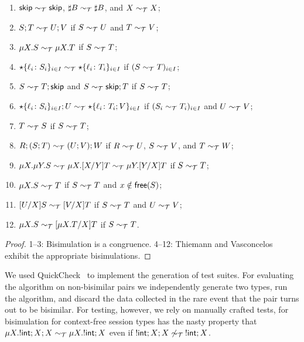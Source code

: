 \begin{theorem}
  \begin{enumerate}
  \item $\mathsf{skip} \sim_\mathcal T \mathsf{skip}$,  $\sharp B \sim_\mathcal T \sharp B$, and
    $X \sim_\mathcal T X$;
  \item $S;T \sim_\mathcal T U;V$ if $S \sim_\mathcal T U$ and $T \sim_\mathcal T V$; 
  \item $\mu X.S \sim_\mathcal T \mu X.T$ if $S \sim_\mathcal T T$; 
  \item $\star\{\ell_i\colon S_i\}_{i\in I}\sim_\mathcal T
    \star\{\ell_i\colon T_i\}_{i\in I}$ if $(S \sim_\mathcal T T)_{i\in
      I}$;
  \item $S\sim_\mathcal T T;\mathsf{skip}$ and $S\sim_\mathcal T \mathsf{skip};T$ if $S \sim_\mathcal T T$;
  \item $\star\{\ell_i\colon S_i\}_{i\in I};U\sim_\mathcal T
    \star\{\ell_i\colon T_i;V\}_{i\in I}$ if $(S_i \sim_\mathcal T T_i)_{i\in
      I}$ and $U \sim_\mathcal T V$;
  \item $T \sim_\mathcal T S$ if $S \sim_\mathcal T T$;
  \item $R;(S;T) \sim_\mathcal T (U;V);W$ if $R \sim_\mathcal T U$, $S \sim_\mathcal T V$, and $T\sim_\mathcal T W$;
  \item
    $\mu X.\mu Y.S \sim_\mathcal T \mu X.[{X}/{Y}]T \sim_\mathcal T \mu Y.[{Y}/{X}]T$ if $S \sim_\mathcal T T$;
  \item $\mu X.S \sim_\mathcal T T$ if $S \sim_\mathcal T T$ and $x\notin\mathsf{free}(S)$;
  \item $[{U}/{X}]S\sim_\mathcal T [{V}/{X}]T$  if $S \sim_\mathcal T T$ and $U \sim_\mathcal T V$; 
  \item $\mu X.S \sim_\mathcal T [{\mu X.T}/{X}]T$ if $S \sim_\mathcal T T$.
  \end{enumerate}
\end{theorem}
%
\begin{proof}
  1--3: Bisimulation is a congruence. 4--12: Thiemann and
  Vasconcelos~\cite{thiemann2016context} exhibit the appropriate
  bisimulations.
\end{proof}

We used QuickCheck~\cite{DBLP:conf/icfp/ClaessenH00} to implement the
generation of test suites. For evaluating the algorithm on
non-bisimilar pairs we independently generate two types, run the
algorithm, and discard the data collected in the rare event that the
pair turns out to be bisimilar.
%
For testing, however, we rely on manually crafted tests, for
bisimulation for context-free session types has the nasty property
that $\mu X. !\mathsf{int};X;X \sim_\mathcal T \mu X. !\mathsf{int};X$ even if
$!\mathsf{int};X;X \not\sim_\mathcal T\: !\mathsf{int};X$.

